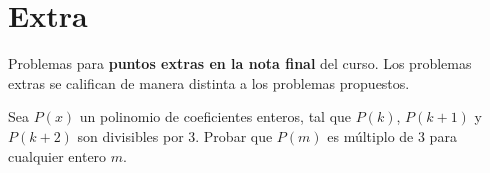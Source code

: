 \section{Extra}

Problemas para \textbf{puntos extras en la nota final} del curso.
Los problemas extras se califican de manera distinta a los problemas propuestos.

\begin{problem}
    Sea $P(x)$ un polinomio de coeficientes enteros, tal que $P(k)$, $P(k + 1)$ y $P(k + 2)$ son divisibles por 3.
    Probar que $P(m)$ es múltiplo de 3 para cualquier entero $m$.
\end{problem}